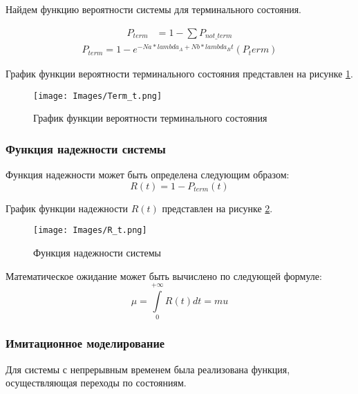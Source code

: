 Найдем функцию вероятности системы для терминального состояния.

\begin{align*}
    P_{term}&=1 - \sum P_{not\_term}
\end{align*}
\begin{equation}
    \begin{aligned}
    P_{term} = 1 - e^{-{{ Na * lambda_A + Nb * lambda_B }} t} ( {{ P_term }} )
    \end{aligned}
\end{equation}

График функции вероятности терминального состояния представлен на рисунке \ref{Term_t}.

\begin{figure}[H]
\centerline{\texttt{[image: Images/Term\_t.png]}}
\caption{График функции вероятности терминального состояния}
\label{Term_t}
\end{figure}

\subsubsection{Функция надежности системы}

Функция надежности может быть определена следующим образом:
$$R(t)= 1 - P_{term}(t)$$

График функции надежности $R(t)$ представлен на рисунке \ref{R_t}.
\begin{figure}[H]
\centerline{\texttt{[image: Images/R\_t.png]}}
\caption{Функция надежности системы}
\label{R_t}
\end{figure}
Математическое ожидание может быть вычислено по следующей формуле:
$$\mu = \int\limits_0^{+\infty}R(t)dt = {{ mu }}$$

\subsubsection{Имитационное моделирование}

Для системы с непрерывным временем была реализована функция, осуществляющая переходы по состояниям.

